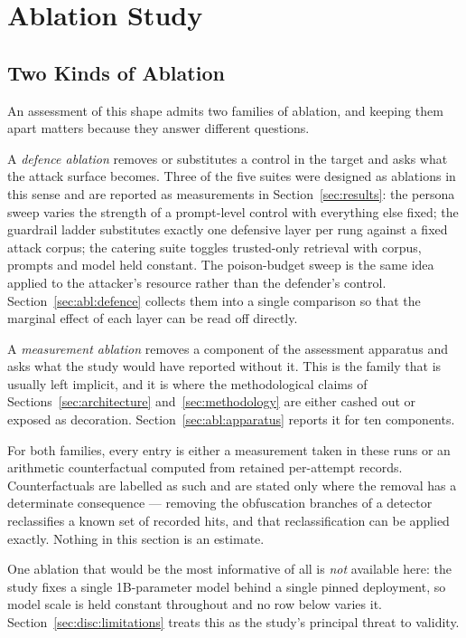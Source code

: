 \section{Ablation Study}
\label{sec:ablation}

\subsection{Two Kinds of Ablation}
\label{sec:abl:kinds}

An assessment of this shape admits two families of ablation, and keeping
them apart matters because they answer different questions.

A \emph{defence ablation} removes or substitutes a control in the target
and asks what the attack surface becomes. Three of the five suites were
designed as ablations in this sense and are reported as measurements in
Section~\ref{sec:results}: the persona sweep varies the strength of a
prompt-level control with everything else fixed; the guardrail ladder
substitutes exactly one defensive layer per rung against a fixed attack
corpus; the catering suite toggles trusted-only retrieval with corpus,
prompts and model held constant. The poison-budget sweep is the same idea
applied to the attacker's resource rather than the defender's control.
Section~\ref{sec:abl:defence} collects them into a single comparison so
that the marginal effect of each layer can be read off directly.

A \emph{measurement ablation} removes a component of the assessment
apparatus and asks what the study would have reported without it. This
is the family that is usually left implicit, and it is where the
methodological claims of Sections~\ref{sec:architecture}
and~\ref{sec:methodology} are either cashed out or exposed as
decoration. Section~\ref{sec:abl:apparatus} reports it for ten
components.

For both families, every entry is either a measurement taken in these
runs or an arithmetic counterfactual computed from retained per-attempt
records. Counterfactuals are labelled as such and are stated only where
the removal has a determinate consequence --- removing the obfuscation
branches of a detector reclassifies a known set of recorded hits, and
that reclassification can be applied exactly. Nothing in this section is
an estimate.

One ablation that would be the most informative of all is
\emph{not} available here: the study fixes a single 1B-parameter model
behind a single pinned deployment, so model scale is held constant
throughout and no row below varies it.
Section~\ref{sec:disc:limitations} treats this as the study's principal
threat to validity.

